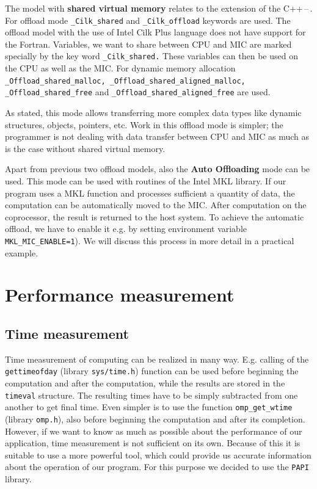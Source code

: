 The model with \textbf{shared virtual memory} relates to the extension of the C++\,--\,. For offload mode \texttt{\_Cilk\_shared} and \texttt{\_Cilk\_offload} keywords are used. The offload model with the use of Intel Cilk Plus language does not have support for the Fortran. Variables, we want to share between CPU and MIC are marked specially by the key word \texttt{\_Cilk\_shared.} These variables can then be used on the CPU as well as the MIC. For dynamic memory allocation \texttt{\_Offload\_shared\_malloc, \_Offload\_shared\_aligned\_malloc, \_Offload\_shared\_free} and \texttt{\_Offload\_shared\_aligned\_free} are used.

\par As stated, this mode allows transferring more complex data types like dynamic structures, objects, pointers, etc. Work in this offload mode is simpler; the programmer is not dealing with data transfer between CPU and MIC as much as is the case without shared virtual memory.

\par Apart from previous two offload models, also the \textbf{Auto Offloading} mode can be used. This mode can be used with routines of the Intel MKL library. If our program uses a MKL function and processes sufficient a quantity of data, the computation can be automatically moved to the MIC. After computation on the coprocessor, the result is returned to the host system. To achieve the automatic offload, we have to enable it e.g. by setting environment variable \texttt{MKL\_MIC\_ENABLE=1}). We will discuss this process in more detail in a practical example.

\section{Performance measurement}

\subsection{Time measurement} 
Time measurement of computing can be realized in many way. E.g. calling of the \texttt{gettimeofday} (library \texttt{sys/time.h}) function can be used before beginning the computation and after the computation, while the results are stored in the \texttt{timeval} structure. The resulting times have to be simply subtracted from one another to get final time. Even simpler is to use the function \texttt{omp\_get\_wtime} (library \texttt{omp.h}), also before beginning the computation and after its completion. However, if we want to know as much as possible about the performance of our application, time measurement is not sufficient on its own. Because of this it is suitable to use a more powerful tool, which could provide us accurate information about the operation of our program. For this purpose we decided to use the \texttt{PAPI} library.

